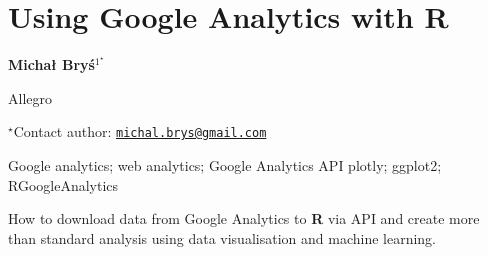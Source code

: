 \documentclass[\main/boa.tex]{subfiles}
\begin{document}
\section{Using Google Analytics with R}

\begin{center}
  {\bf {} Michał Bryś$^{1^\star}$}
\end{center}

\vskip 0.3cm

\begin{affiliations}
\begin{enumerate}
\begin{minipage}{0.915\textwidth}
\centering
\item Allegro \\[-2pt]
\end{minipage}
\end{enumerate}
$^\star$Contact author: \href{mailto:michal.brys@gmail.com}{\nolinkurl{michal.brys@gmail.com}}\\
\end{affiliations}

\vskip 0.5cm

\begin{minipage}{0.915\textwidth}
\keywords Google analytics; web analytics; Google Analytics API
\packages {} plotly;  ggplot2;  RGoogleAnalytics
\end{minipage}

\vskip 0.8cm

How to download data from Google Analytics to \textbf{R} via API and
create more than standard analysis using data visualisation and machine
learning.
\end{document}
